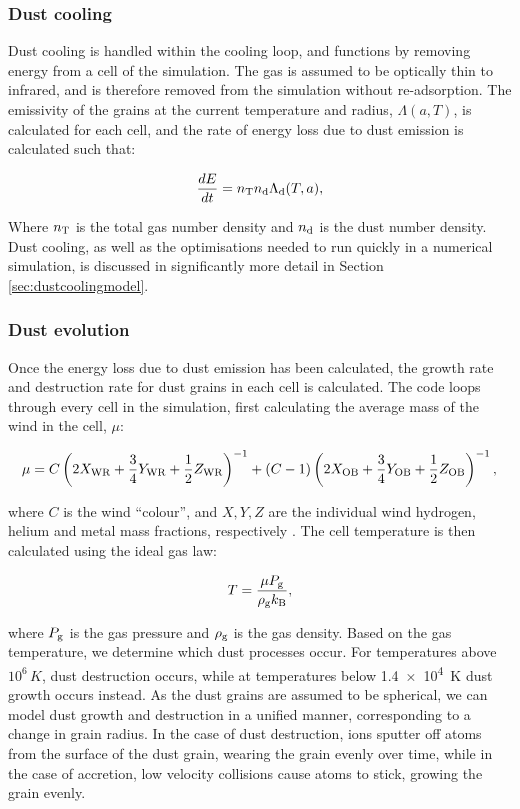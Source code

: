 \subsubsection{Dust cooling}

Dust cooling is handled within the cooling loop, and functions by removing energy from a cell of the simulation.
The gas is assumed to be optically thin to infrared, and is therefore removed from the simulation without re-adsorption.
The emissivity of the grains at the current temperature and radius, $\Lambda(a,T)$, is calculated for each cell, and the rate of energy loss due to dust emission is calculated such that:

\begin{equation}
  \frac{dE}{dt} = n_\text{T} n_\text{d} \Lambda_\text{d}(T,a),
\end{equation}

\noindent
Where $n_\text{T}$ is the total gas number density and $n_\text{d}$ is the dust number density.
Dust cooling, as well as the optimisations needed to run quickly in a numerical simulation, is discussed in significantly more detail in Section \ref{sec:dustcoolingmodel}.

\subsubsection{Dust evolution}

Once the energy loss due to dust emission has been calculated, the growth rate and destruction rate for dust grains in each cell is calculated.
The code loops through every cell in the simulation, first calculating the average mass of the wind in the cell, $\mu$:

\begin{equation}
  \mu = C \left(2 X_\text{WR} + \frac{3}{4} Y_\text{WR} + \frac{1}{2} Z_\text{WR} \right)^{-1} + (C-1) \left(2 X_\text{OB} + \frac{3}{4} Y_\text{OB} + \frac{1}{2} Z_\text{OB} \right)^{-1} ,
\end{equation}

\noindent
where $C$ is the wind ``colour'', and $X,Y,Z$ are the individual wind hydrogen, helium and metal mass fractions, respectively
\parencite{mihalasStellarAtmospheres1978}.
The cell temperature is then calculated using the ideal gas law:

\begin{equation}
  T = \frac{\mu P_\text{g}}{\rho_\text{g} k_\text{B}},
\end{equation}

\noindent
where $P_\text{g}$ is the gas pressure and $\rho_\text{g}$ is the gas density.
Based on the gas temperature, we determine which dust processes occur.
For temperatures above $10^6 \, \si{K}$, dust destruction occurs, while at temperatures below \SI{1.4e4}{K} dust growth occurs instead.
As the dust grains are assumed to be spherical, we can model dust growth and destruction in a unified manner, corresponding to a change in grain radius.
In the case of dust destruction, ions sputter off atoms from the surface of the dust grain, wearing the grain evenly over time, while in the case of accretion, low velocity collisions cause atoms to stick, growing the grain evenly.

